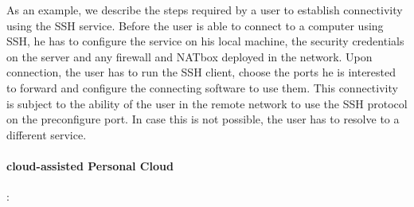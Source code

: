 As an example, we describe the steps required by a user to establish
connectivity using the SSH service. Before the user is able to connect to a
computer using SSH, he has to configure the service on his local machine, the
security credentials on the server and any firewall and NATbox deployed in the
network. Upon connection, the user has to run the SSH client, choose the ports
he is interested to forward and configure the connecting software to use them.
This connectivity is subject to the ability of the user in the remote network to
use the SSH protocol on the preconfigure port.  In case this is not possible,
the user has to resolve to a different service.

\paragraph*{cloud-assisted Personal Cloud}:


